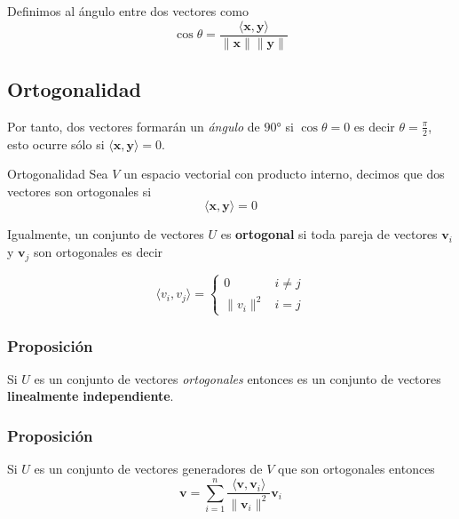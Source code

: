\documentclass[
]{article}
\begin{document}
Definimos al ángulo entre dos vectores como \[
\cos\theta = \frac{\langle \mathbf{x}, \mathbf{y}\rangle}{\|\mathbf{x}\|\|\mathbf{y}\|}
\]

\hypertarget{ortogonalidad}{%
\subsection{Ortogonalidad}\label{ortogonalidad}}

Por tanto, dos vectores formarán un \emph{ángulo} de \(90°\) si
\(\cos \theta=0\) es decir \(\theta=\frac{\pi}{2}\), esto ocurre sólo si
\(\langle \mathbf{x},\mathbf{y}\rangle = 0\).

Ortogonalidad Sea \(V\) un espacio vectorial con producto interno,
decimos que dos vectores son ortogonales si \begin{equation}
  \langle \mathbf{x}, \mathbf{y} \rangle =0
  \end{equation}

Igualmente, un conjunto de vectores \(U\) es \textbf{ortogonal} si toda
pareja de vectores \(\mathbf{v}_i\) y \(\mathbf{v}_j\) son ortogonales
es decir

\[
\langle v_i, v_j \rangle = \begin{cases}
                                    0 & i\ne j\\
                                    \|v_i\|^2 & i=j
                            \end{cases}
\]

\hypertarget{proposiciuxf3n}{%
\subsubsection{Proposición}\label{proposiciuxf3n}}

Si \(U\) es un conjunto de vectores \emph{ortogonales} entonces es un
conjunto de vectores \textbf{linealmente} \textbf{independiente}.

\hypertarget{proposiciuxf3n-1}{%
\subsubsection{Proposición}\label{proposiciuxf3n-1}}

Si \(U\) es un conjunto de vectores generadores de \(V\) que son
ortogonales entonces \[
\mathbf{v}=\sum_{i=1}^n \frac{\langle \mathbf{v},\mathbf{v}_i \rangle}{\|\mathbf{v}_i\|^2}\mathbf{v}_i
\]
\end{document}
